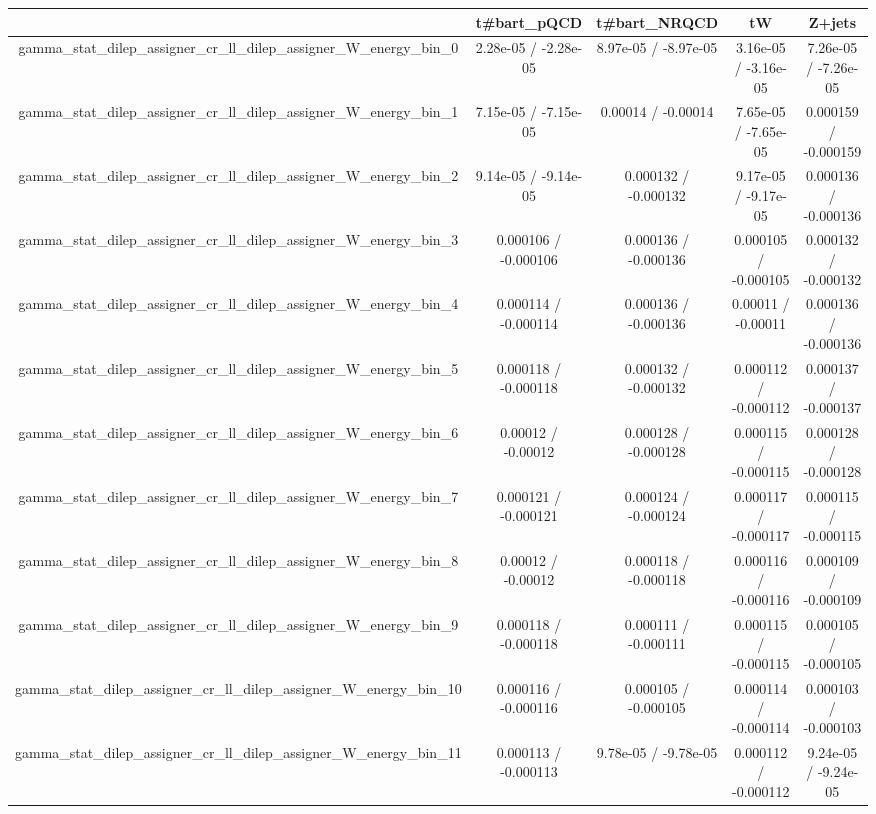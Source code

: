 \documentclass[10pt]{article}
\begin{document}
\begin{table}[htbp]
\begin{center}
\begin{tabular}{|c|c|c|c|c|}
\hline 
      & t#bar{t}_{pQCD}      & t#bar{t}_{NRQCD}      & tW      & Z+jets \\ 
\hline 
  gamma_stat_dilep_assigner_cr_ll_dilep_assigner_W_energy_bin_0 & 2.28e-05 / -2.28e-05 & 8.97e-05 / -8.97e-05 & 3.16e-05 / -3.16e-05 & 7.26e-05 / -7.26e-05 \\ 
  gamma_stat_dilep_assigner_cr_ll_dilep_assigner_W_energy_bin_1 & 7.15e-05 / -7.15e-05 & 0.00014 / -0.00014 & 7.65e-05 / -7.65e-05 & 0.000159 / -0.000159 \\ 
  gamma_stat_dilep_assigner_cr_ll_dilep_assigner_W_energy_bin_2 & 9.14e-05 / -9.14e-05 & 0.000132 / -0.000132 & 9.17e-05 / -9.17e-05 & 0.000136 / -0.000136 \\ 
  gamma_stat_dilep_assigner_cr_ll_dilep_assigner_W_energy_bin_3 & 0.000106 / -0.000106 & 0.000136 / -0.000136 & 0.000105 / -0.000105 & 0.000132 / -0.000132 \\ 
  gamma_stat_dilep_assigner_cr_ll_dilep_assigner_W_energy_bin_4 & 0.000114 / -0.000114 & 0.000136 / -0.000136 & 0.00011 / -0.00011 & 0.000136 / -0.000136 \\ 
  gamma_stat_dilep_assigner_cr_ll_dilep_assigner_W_energy_bin_5 & 0.000118 / -0.000118 & 0.000132 / -0.000132 & 0.000112 / -0.000112 & 0.000137 / -0.000137 \\ 
  gamma_stat_dilep_assigner_cr_ll_dilep_assigner_W_energy_bin_6 & 0.00012 / -0.00012 & 0.000128 / -0.000128 & 0.000115 / -0.000115 & 0.000128 / -0.000128 \\ 
  gamma_stat_dilep_assigner_cr_ll_dilep_assigner_W_energy_bin_7 & 0.000121 / -0.000121 & 0.000124 / -0.000124 & 0.000117 / -0.000117 & 0.000115 / -0.000115 \\ 
  gamma_stat_dilep_assigner_cr_ll_dilep_assigner_W_energy_bin_8 & 0.00012 / -0.00012 & 0.000118 / -0.000118 & 0.000116 / -0.000116 & 0.000109 / -0.000109 \\ 
  gamma_stat_dilep_assigner_cr_ll_dilep_assigner_W_energy_bin_9 & 0.000118 / -0.000118 & 0.000111 / -0.000111 & 0.000115 / -0.000115 & 0.000105 / -0.000105 \\ 
  gamma_stat_dilep_assigner_cr_ll_dilep_assigner_W_energy_bin_10 & 0.000116 / -0.000116 & 0.000105 / -0.000105 & 0.000114 / -0.000114 & 0.000103 / -0.000103 \\ 
  gamma_stat_dilep_assigner_cr_ll_dilep_assigner_W_energy_bin_11 & 0.000113 / -0.000113 & 9.78e-05 / -9.78e-05 & 0.000112 / -0.000112 & 9.24e-05 / -9.24e-05 \\ 

\end{tabular}
\end{center}
\end{table}
\end{document}
